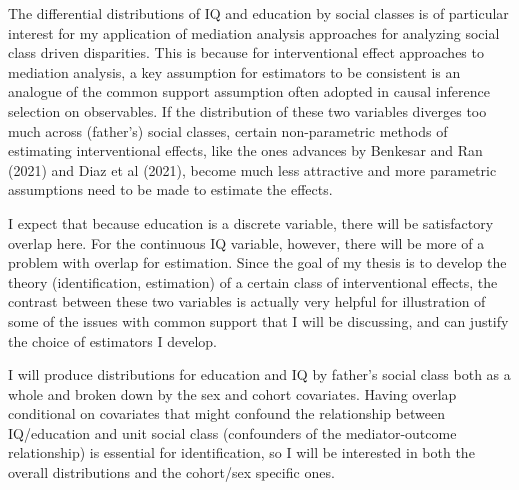 \documentclass[
]{article}
\begin{document}
The differential distributions of IQ and education by social classes is
of particular interest for my application of mediation analysis
approaches for analyzing social class driven disparities. This is
because for interventional effect approaches to mediation analysis, a
key assumption for estimators to be consistent is an analogue of the
common support assumption often adopted in causal inference selection on
observables. If the distribution of these two variables diverges too
much across (father's) social classes, certain non-parametric methods of
estimating interventional effects, like the ones advances by Benkesar
and Ran (2021) and Diaz et al (2021), become much less attractive and
more parametric assumptions need to be made to estimate the effects.

I expect that because education is a discrete variable, there will be
satisfactory overlap here. For the continuous IQ variable, however,
there will be more of a problem with overlap for estimation. Since the
goal of my thesis is to develop the theory (identification, estimation)
of a certain class of interventional effects, the contrast between these
two variables is actually very helpful for illustration of some of the
issues with common support that I will be discussing, and can justify
the choice of estimators I develop.

I will produce distributions for education and IQ by father's social
class both as a whole and broken down by the sex and cohort covariates.
Having overlap conditional on covariates that might confound the
relationship between IQ/education and unit social class (confounders of
the mediator-outcome relationship) is essential for identification, so I
will be interested in both the overall distributions and the cohort/sex
specific ones.
\end{document}
